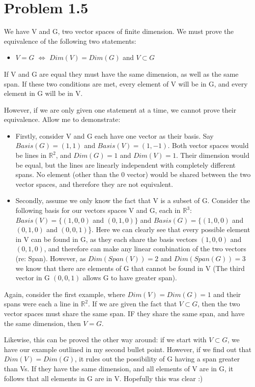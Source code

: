 \documentclass{article}
\begin{document}
\section{Problem 1.5}
We have V and G, two vector spaces of finite dimension. We must prove the equivalence of the following two statements:
\begin{itemize}
    \item $V=G$ $\Longleftrightarrow$ $Dim(V) = Dim(G)$ and $V\subset G$ 
\end{itemize}
If V and G are equal they must have the same dimension, as well as the same span. If these two conditions are met,  every element of V will be in G, and every element in G will be in V. 
\par
However, if we are only given one statement at a time, we cannot prove their equivalence. Allow me to demonstrate:
\begin{itemize}
    \item Firstly, consider V and G each have one vector as their basis. Say $Basis(G) = (1,1)$ and $Basis(V)=(1,-1)$. Both vector spaces would be lines in $\mathbb{R}^2$, and $Dim(G)=1$ and $Dim(V)=1$. Their dimension would be equal, but the lines are linearly independent with completely different spans. No element (other than the 0 vector) would be shared between the two vector spaces, and therefore they are not equivalent.
    
    \item Secondly, assume we only know the fact that V is a subset of G. Consider the following basis for our vectors spaces V and G, each in $\mathbb{R}^3$: $Basis(V)=\{(1,0,0)$ and $(0,1,0)\}$ and $Basis(G)=\{(1,0,0)$ and $(0,1,0)$ and $(0,0,1)$\}. Here we can clearly see that every possible element in V can be found in G, as they each share the basis vectors $(1,0,0)$ and $(0,1,0)$, and therefore can make any linear combination of the two vectors (re: Span). However, as $Dim(Span(V))=2$ and $Dim(Span(G))=3$ we know that there are elements of G that cannot be found in V (The third vector in G $(0,0,1)$ allows G to have greater span).
  
\end{itemize}
\par
Again, consider the first example, where $Dim(V)=Dim(G)=1$ and their spans were each a line in $\mathbb{R}^2$. If we are given the fact that $V\subset G$, then the two vector spaces must share the same span. IF they share the same span, and have the same dimension, then $V=G$.\par
Likewise, this can be proved the other way around: if we start  with $V\subset G$, we have our example outlined in my second bullet point. However, if we find out that $Dim(V) = Dim(G)$, it rules out the possibility of G having a span greater than Vs. If they have the same dimension, and all elements of V are in G, it follows that all elements in G are in V. Hopefully this was clear :)
\end{document}
